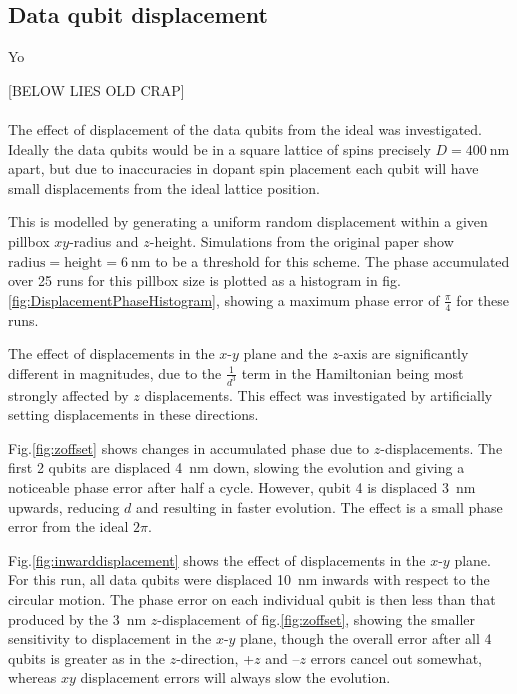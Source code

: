 
\subsection{Data qubit displacement}
Yo

[BELOW LIES OLD CRAP]\\
\\

The effect of displacement of the data qubits from the ideal was investigated. Ideally the data qubits would be in a square lattice of spins precisely $D = \SI{400}{\nano\metre}$ apart, but due to inaccuracies in dopant spin placement each qubit will have small displacements from the ideal lattice position.

This is modelled by generating a uniform random displacement within a given pillbox $xy$-radius and $z$-height. Simulations from the original paper show $\textrm{radius} = \textrm{height} = \SI{6}{\nano\metre}$ to be a threshold for this scheme. The phase accumulated over 25 runs for this pillbox size is plotted as a histogram in fig.\@ \ref{fig:DisplacementPhaseHistogram}, showing a maximum phase error of $\tfrac{\pi}{4}$ for these runs. 



The effect of displacements in the $x$-$y$ plane and the $z$-axis are significantly different in magnitudes, due to the $\tfrac{1}{d^3}$ term in the Hamiltonian being most strongly affected by $z$ displacements. This effect was investigated by artificially setting displacements in these directions.

Fig.\@ \ref{fig:zoffset} shows changes in accumulated phase due to $z$-displacements. The first 2 qubits are displaced \SI{4}{\nano\metre} down, slowing the evolution and giving a noticeable phase error after half a cycle. However, qubit 4 is displaced \SI{3}{\nano\metre} upwards, reducing $d$ and resulting in faster evolution. The effect is a small phase error from the ideal $2\pi$.

Fig.\@ \ref{fig:inwarddisplacement} shows the effect of displacements in the $x$-$y$ plane. For this run, all data qubits were displaced \SI{10}{\nano\metre} inwards with respect to the circular motion. The phase error on each individual qubit is then less than that produced by the \SI{3}{\nano\metre} $z$-displacement of fig.\@ \ref{fig:zoffset}, showing the smaller sensitivity to displacement in the $x$-$y$ plane, though the overall error after all 4 qubits is greater as in the $z$-direction, +$z$ and --$z$ errors cancel out somewhat, whereas $xy$ displacement errors will always slow the evolution.



